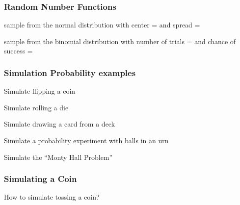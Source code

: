 \documentclass[12pt]{beamer}\usepackage[]{graphicx}\usepackage[]{color}
\begin{document}

\begin{frame}
\frametitle{Random Number Functions}

{\hilit {}} sample from the normal distribution with center =  and spread = 

\pause
\bigskip
{\hilit {}} sample from the binomial distribution with number of trials =  and chance of success = 

\end{frame}


\begin{frame}
\begin{center}
\Huge{}
\end{center}
\end{frame}


\begin{frame}
\frametitle{Simulation Probability examples}

\bbi
  \item Simulate flipping a coin
  \item Simulate rolling a die
  \item Simulate drawing a card from a deck
  \item Simulate a probability experiment with balls in an urn
  \item Simulate the ``Monty Hall Problem''
\ei
\eb

\end{frame}


\begin{frame}
\begin{center}
\Huge{}
\end{center}
\end{frame}


\begin{frame}
\frametitle{Simulating a Coin}

How to simulate tossing a coin?

\begin{center}
\end{center}

\end{frame}
\end{document}
